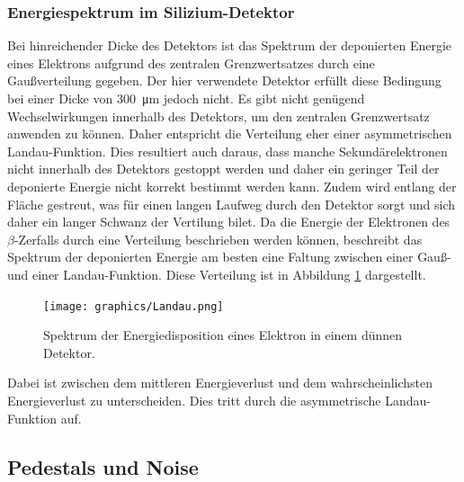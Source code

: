 \subsubsection{Energiespektrum im Silizium-Detektor}
Bei hinreichender Dicke des Detektors ist das Spektrum der deponierten Energie eines
Elektrons aufgrund des zentralen Grenzwertsatzes durch eine Gaußverteilung gegeben.
Der hier verwendete Detektor erfüllt diese Bedingung bei einer Dicke von
\SI{300}{\micro\meter} jedoch nicht. Es gibt nicht genügend Wechselwirkungen
innerhalb des Detektors, um den zentralen Grenzwertsatz anwenden zu können.
Daher entspricht die Verteilung eher einer asymmetrischen Landau-Funktion.
Dies resultiert auch daraus, dass manche
Sekundärelektronen nicht innerhalb des Detektors gestoppt werden und daher
ein geringer Teil der deponierte Energie nicht korrekt bestimmt werden kann. Zudem
wird entlang der Fläche gestreut, was für einen langen Laufweg durch den Detektor
sorgt und sich daher ein langer Schwanz der Vertilung bilet.
Da die Energie der Elektronen des $\beta$-Zerfalls durch eine Verteilung beschrieben
werden können, beschreibt das Spektrum der deponierten Energie am besten eine Faltung zwischen
einer Gauß- und einer Landau-Funktion. Diese Verteilung ist in Abbildung \ref{fig:faltung}
dargestellt.
\begin{figure}[htb]
  \centering
  \texttt{[image: graphics/Landau.png]}
  \caption{Spektrum der Energiedisposition eines Elektron in einem dünnen Detektor. \cite{anleitung}}
  \label{fig:faltung}
\end{figure}
Dabei ist zwischen dem mittleren Energieverlust und dem wahrscheinlichsten Energieverlust
zu unterscheiden. Dies tritt durch die asymmetrische Landau-Funktion auf.


\FloatBarrier
\subsection{Pedestals und Noise}
\label{sec:Theorie_Noise}

